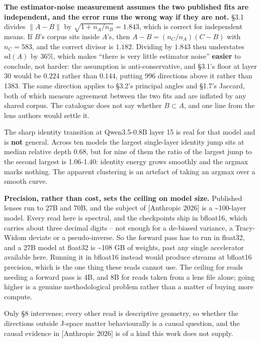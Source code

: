 \documentclass[10pt,letterpaper,twocolumn]{article}
\begin{document}
\textbf{The estimator-noise measurement assumes the two published fits are independent, and the error
runs the wrong way if they are not.} §3.1 divides \(\lVert A-B\rVert\) by
\(\sqrt{1+n_A/n_B}=1.843\), which is correct for independent means. If \(B\)'s corpus sits inside
\(A\)'s, then \(A-B=(n_C/n_A)(C-B)\) with \(n_C=583\), and the correct divisor is \(1.182\). Dividing by
\(1.843\) then understates \(\mathrm{sd}(A)\) by 36\%, which makes ``there is very little estimator
noise'' \textbf{easier} to conclude, not harder: the assumption is anti-conservative, and §3.1's floor at
layer 30 would be \(0.224\) rather than \(0.144\), putting 996 directions above it rather than 1383.
The same direction applies to §3.2's principal angles and §1.7's Jaccard, both of which measure
agreement between the two fits and are inflated by any shared corpus. The catalogue does not say
whether \(B\subset A\), and one line from the lens authors would settle it.

The sharp identity transition at Qwen3.5-0.8B layer 15 is real for that model and is \textbf{not} general. Across ten models the largest single-layer identity jump sits at median relative depth 0.68, but for nine of them the ratio of the largest jump to the second largest is 1.06-1.40: identity energy grows smoothly and the argmax marks nothing. The apparent clustering is an artefact of taking an argmax over a smooth curve.

\textbf{Precision, rather than cost, sets the ceiling on model size.} Published lenses run to 27B and 70B, and the subject of {[}Anthropic 2026{]} is a \textasciitilde100-layer model. Every read here is spectral, and the checkpoints ship in bfloat16, which carries about three decimal digits -- not enough for a de-biased variance, a Tracy-Widom deviate or a pseudo-inverse. So the forward pass has to run in float32, and a 27B model at float32 is \textasciitilde108 GB of weights, past any single accelerator available here. Running it in bfloat16 instead would produce streams at bfloat16 precision, which is the one thing these reads cannot use. The ceiling for reads needing a forward pass is 4B, and 8B for reads taken from a lens file alone; going higher is a genuine methodological problem rather than a matter of buying more compute.

Only §8 intervenes; every other read is descriptive geometry, so whether the directions outside J-space matter behaviourally is a causal question, and the causal evidence in {[}Anthropic 2026{]} is of a kind this work does not supply.
\end{document}
